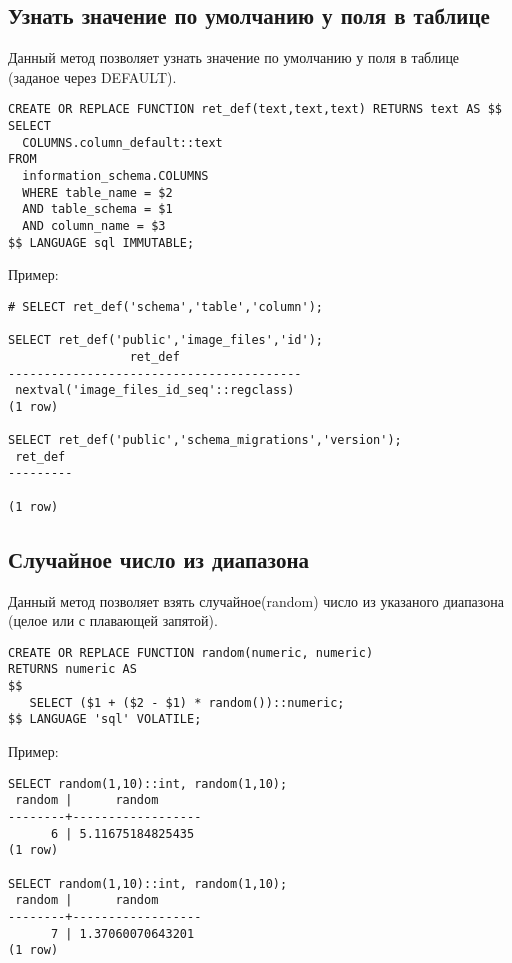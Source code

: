\subsection{Узнать значение по умолчанию у поля в таблице}
Данный метод позволяет узнать значение по умолчанию у поля в таблице (заданое через DEFAULT).

\begin{lstlisting}[label=lst:snippets6,title=snippets/default\_value.sql]
CREATE OR REPLACE FUNCTION ret_def(text,text,text) RETURNS text AS $$
SELECT 
  COLUMNS.column_default::text
FROM 
  information_schema.COLUMNS
  WHERE table_name = $2
  AND table_schema = $1
  AND column_name = $3
$$ LANGUAGE sql IMMUTABLE;
\end{lstlisting}

Пример:
\begin{lstlisting}[label=lst:snippets7,caption=Узнать значение по умолчанию у поля в таблице. Пример]
# SELECT ret_def('schema','table','column');

SELECT ret_def('public','image_files','id');
                 ret_def                 
-----------------------------------------
 nextval('image_files_id_seq'::regclass)
(1 row)

SELECT ret_def('public','schema_migrations','version');
 ret_def 
---------
 
(1 row)
\end{lstlisting}

\subsection{Случайное число из диапазона}
Данный метод позволяет взять случайное(random) число из указаного диапазона (целое или с плавающей запятой).

\begin{lstlisting}[label=lst:snippets8,title=snippets/random\_from\_range.sql]
CREATE OR REPLACE FUNCTION random(numeric, numeric)
RETURNS numeric AS
$$
   SELECT ($1 + ($2 - $1) * random())::numeric;
$$ LANGUAGE 'sql' VOLATILE;
\end{lstlisting}

Пример:
\begin{lstlisting}[label=lst:snippets9,caption=Случайное число из диапазона. Пример]
SELECT random(1,10)::int, random(1,10);
 random |      random      
--------+------------------
      6 | 5.11675184825435
(1 row)

SELECT random(1,10)::int, random(1,10);
 random |      random      
--------+------------------
      7 | 1.37060070643201
(1 row)
\end{lstlisting}

